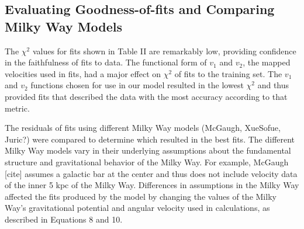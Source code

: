 \documentclass[reprint,%
 amsmath,amssymb,
 aps,
]{revtex4-1}
\begin{document}
\subsection{Evaluating Goodness-of-fits and Comparing Milky Way Models}
The $\chi^{2}$ values for fits shown in Table II are remarkably low, providing confidence in the faithfulness of fits to data. The functional form of ${v_1}$ and ${v_2}$, the mapped velocities used in fits, had a major effect on $\chi^{2}$ of fits to the training set. The ${v_1}$ and ${v_2}$ functions chosen for use in our model resulted in the lowest $\chi^{2}$ and thus provided fits that described the data with the most accuracy according to that metric.

The residuals of fits using different Milky Way models (McGaugh, XueSofue, Juric?) were compared to determine which resulted in the best fits. The different Milky Way models vary in their underlying assumptions about the fundamental structure and gravitational behavior of the Milky Way. For example, McGaugh [cite] assumes a galactic bar at the center and thus does not include velocity data of the inner 5 kpc of the Milky Way. Differences in assumptions in the Milky Way affected the fits produced by the model by changing the values of the Milky Way's gravitational potential and angular velocity used in calculations, as described in Equations 8 and 10. 
\end{document}
